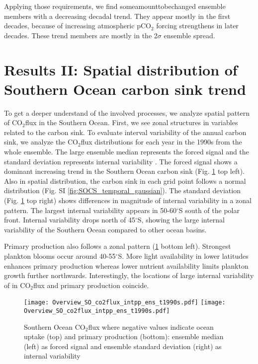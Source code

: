 \documentclass[12pt]{article}
\begin{document}
Applying those requirements, we find someamounttobechanged ensemble members with a decreasing decadal trend. They appear mostly in the first decades, because of increasing atmospheric pCO$_2$ forcing strengthens in later decades. These trend members are mostly in the 2$\sigma$ ensemble spread. 


\section{Results II: Spatial distribution of Southern Ocean carbon sink trend}

To get a deeper understand of the involved processes, we analyze spatial pattern of CO$_2$flux in the Southern Ocean. First, we see zonal structures in variables related to the carbon sink. To evaluate interval variability of the annual carbon sink, we analyze the CO$_2$flux distributions for each year in the 1990s from the whole ensemble.
The large ensemble median represents the forced signal and the standard deviation represents internal variability \citep{Deser2012}. The forced signal shows a dominant increasing trend in the Southern Ocean carbon sink (Fig. \ref{fig:SOCS_ensmean_ensstd} top left). Also in spatial distribution, the carbon sink in each grid point follows a normal distribution (Fig. SI \ref{fig:SOCS_temporal_gaussian}). The standard deviation (Fig. \ref{fig:SOCS_ensmean_ensstd} top right) shows differences in magnitude of internal variability in a zonal pattern. The largest internal variability appears in 50-60$^\circ$S south of the polar front. Internal variability drops north of 45$^\circ$S, showing the large internal variability of the Southern Ocean compared to other ocean basins.

Primary production also follows a zonal pattern (\ref{fig:SOCS_ensmean_ensstd} bottom left). Strongest plankton blooms occur around 40-55$^\circ$S. More light availability in lower latitudes enhances primary production whereas lower nutrient availability limits plankton growth further northwards.  Interestingly, the locations of large internal variability of in CO$_2$flux and primary production coincide.

\begin{figure}[h]
\centering
\texttt{[image: Overview\_SO\_co2flux\_intpp\_ens\_t1990s.pdf]} %
\texttt{[image: Overview\_SO\_co2flux\_intpp\_ens\_t1990s.pdf]} %
\caption{Southern Ocean CO$_2$flux where negative values indicate ocean uptake (top) and primary production (bottom): ensemble median (left) as forced signal and ensemble standard deviation (right) as internal variability}
\label{fig:SOCS_ensmean_ensstd}
\end{figure}
\end{document}
